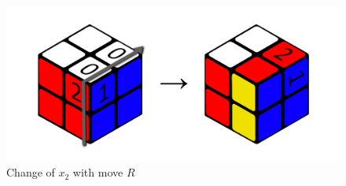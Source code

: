 \documentclass[12pt,a4paper]{article}
\theoremstyle{custom}
\begin{document}
\begin{figure}[H]
\centering
\includegraphics[scale=0.13]{TransitionfunctionR.png}
\caption{Change of $x_2$ with move $R$}
\label{Figure_Transition functionR}
\end{figure}
\end{document}
